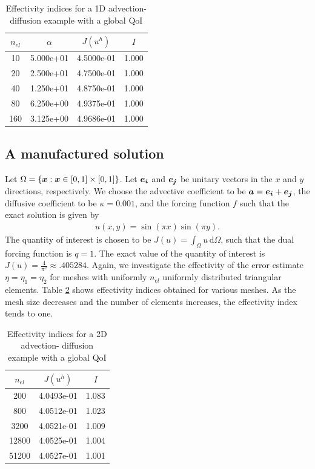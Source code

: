 \begin{table}[hbt!]
\centering
\begin{tabular}{|c | c | c | c |}
\hline
$n_{el}$ & $\alpha$ & $J(u^h)$ & $I$ \\ \hline\hline
10 & 5.000e+01 & 4.5000e-01 & 1.000 \\ \hline
20 & 2.500e+01 & 4.7500e-01 & 1.000 \\ \hline
40 & 1.250e+01 & 4.8750e-01 & 1.000 \\ \hline
80 & 6.250e+00 & 4.9375e-01 & 1.000 \\ \hline
160 & 3.125e+00 & 4.9686e-01 & 1.000 \\ \hline
\end{tabular}
\caption{Effectivity indices for a 1D advection-
diffusion example with a global QoI}
\label{table:1D}
\end{table}

\subsection{A manufactured solution}

Let $\Omega = \{ \boldsymbol{x} : \boldsymbol{x} \in [0,1] \times [0,1] \}$.
Let $\boldsymbol{e_i}$ and $\boldsymbol{e_j}$ be unitary vectors in the
$x$ and $y$ directions, respectively.
We choose the advective coefficient to be
$\boldsymbol{a} = \boldsymbol{e_i} + \boldsymbol{e_j}$, the diffusive
coefficient to be $\kappa = 0.001$, and the forcing function
$f$ such that the exact solution is given by
%
\begin{gather}
u(x,y) = \sin( \pi x) \sin( \pi y).
\label{eq:ex2_exact}
\end{gather}
%
The quantity of interest is chosen to be
$J(u) = \int_{\Omega} u \, \text{d} \Omega$, such that the dual
forcing function is $q = 1$. The exact value of the quantity of
interest is $J(u) = \frac{4}{\pi^2} \approx .405284$.
Again, we investigate the effectivity of the error estimate
$\eta = \eta_1 = \eta_2$ for meshes with uniformly
$n_{el}$ uniformly distributed triangular elements.
Table \ref{table:2D_mf_1} shows effectivity indices obtained
for various meshes. As the mesh size decreases and the
number of elements increases, the effectivity index
tends to one.

\begin{table}[hbt!]
\centering
\begin{tabular}{| c | c | c |}
\hline
$n_{el}$ & $J(u^h)$ & $I$ \\ \hline\hline
200 & 4.0493e-01 & 1.083 \\ \hline
800 & 4.0512e-01 & 1.023 \\ \hline
3200 & 4.0521e-01 & 1.009 \\ \hline
12800 & 4.0525e-01 & 1.004 \\ \hline
51200 & 4.0527e-01 & 1.001 \\ \hline
\end{tabular}
\caption{Effectivity indices for a 2D advection-
diffusion example with a global QoI}
\label{table:2D_mf_1}
\end{table}

